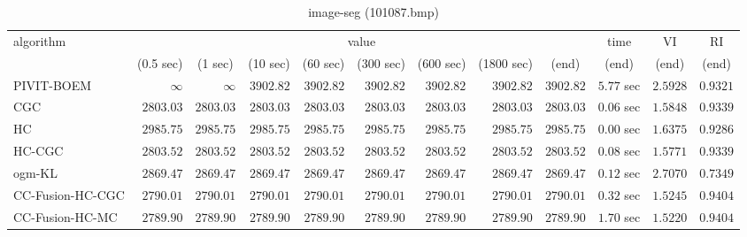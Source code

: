 \begin{table}[H]
\scriptsize
\centering
\caption{image-seg (101087.bmp)}
\label{tab:anytimetable-image-seg-101087.bmp}
\begin{tabular}{lrrrrrrrrrrr}
\toprule
           algorithm &                                   \multicolumn{8}{c}{value} & \multicolumn{1}{c}{time}    & \multicolumn{1}{c}{VI}  & \multicolumn{1}{c}{RI} \\  
\cmidrule(lr){2-9}\cmidrule(lr){10-10} \cmidrule(lr){11-11} \cmidrule(lr){12-12}   
                     & \multicolumn{1}{c}{(0.5 sec)} & \multicolumn{1}{c}{(1 sec)} & \multicolumn{1}{c}{(10 sec)} & \multicolumn{1}{c}{(60 sec)} & \multicolumn{1}{c}{(300 sec)} & \multicolumn{1}{c}{(600 sec)} & \multicolumn{1}{c}{(1800 sec)} & \multicolumn{1}{c}{(end)} & \multicolumn{1}{c}{(end)}    & \multicolumn{1}{c}{(end)}   & \multicolumn{1}{c}{(end)}  \\ \midrule 
          PIVIT-BOEM & $\infty$ & $\infty$ & $      3902.82$ & $      3902.82$ & $      3902.82$ & $      3902.82$ & $      3902.82$ & $      3902.82$ & $         5.77$ sec    & $       2.5928$  & $       0.9321$ \\ 
                 CGC & $      2803.03$ & $      2803.03$ & $      2803.03$ & $      2803.03$ & $      2803.03$ & $      2803.03$ & $      2803.03$ & $      2803.03$ & $         0.06$ sec    & $       1.5848$  & $       0.9339$ \\ 
                  HC & $      2985.75$ & $      2985.75$ & $      2985.75$ & $      2985.75$ & $      2985.75$ & $      2985.75$ & $      2985.75$ & $      2985.75$ & $         0.00$ sec    & $       1.6375$  & $       0.9286$ \\ 
              HC-CGC & $      2803.52$ & $      2803.52$ & $      2803.52$ & $      2803.52$ & $      2803.52$ & $      2803.52$ & $      2803.52$ & $      2803.52$ & $         0.08$ sec    & $       1.5771$  & $       0.9339$ \\ 
              ogm-KL & $      2869.47$ & $      2869.47$ & $      2869.47$ & $      2869.47$ & $      2869.47$ & $      2869.47$ & $      2869.47$ & $      2869.47$ & $         0.12$ sec    & $       2.7070$  & $       0.7349$ \\ 
    CC-Fusion-HC-CGC & $      2790.01$ & $      2790.01$ & $      2790.01$ & $      2790.01$ & $      2790.01$ & $      2790.01$ & $      2790.01$ & $      2790.01$ & $         0.32$ sec    & $       1.5245$  & $       0.9404$ \\ 
     CC-Fusion-HC-MC & $      2789.90$ & $      2789.90$ & $      2789.90$ & $      2789.90$ & $      2789.90$ & $      2789.90$ & $      2789.90$ & $      2789.90$ & $         1.70$ sec    & $       1.5220$  & $       0.9404$ \\ 

\end{tabular}
\end{table}
